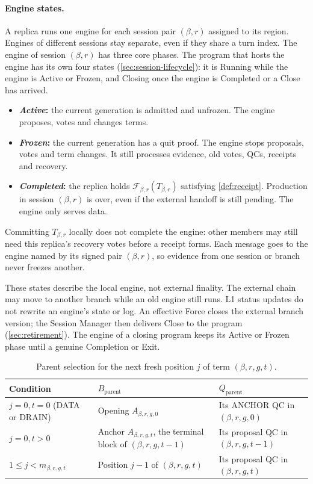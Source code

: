 \documentclass[11pt,a4paper]{article}
\newcommand{\FC}{\mathcal F}
\newcommand{\defterm}[1]{\textcolor{rrBlue}{\textit{#1}}}
\begin{document}
\paragraph{Engine states.}
A replica runs one engine for each session pair $(\beta,r)$ assigned to
its region. Engines of different sessions stay separate, even if they
share a turn index. The engine of session $(\beta,r)$ has three core
phases. The program that hosts the engine has its own four states
(\cref{sec:session-lifecycle}): it is Running while the engine is Active
or Frozen, and Closing once the engine is Completed or a Close has
arrived.
\begin{itemize}
\item \textbf{\defterm{Active}:} the current generation is admitted and
unfrozen. The engine proposes, votes and changes terms.
\item \textbf{\defterm{Frozen}:} the current generation has a quit proof.
The engine stops proposals, votes and term changes. It still processes
evidence, old votes, QCs, receipts and recovery.
\item \textbf{\defterm{Completed}:} the replica holds
$\FC_{\beta,r}(T_{\beta,r})$ satisfying \cref{def:receipt}. Production in
session $(\beta,r)$ is over, even if the external handoff is still
pending. The engine only serves data.
\end{itemize}
Committing $T_{\beta,r}$ locally does not complete the engine: other
members may still need this replica's recovery votes before a receipt
forms. Each message goes to the engine named by its signed pair
$(\beta,r)$, so evidence from one session or branch never freezes
another.

These states describe the local engine, not external finality. The
external chain may move to another branch while an old engine still
runs. L1 status updates do not rewrite an engine's state or log. An
effective Force closes the external branch version; the Session Manager
then delivers Close to the program (\cref{sec:retirement}). The engine
of a closing program keeps its Active or Frozen phase until a genuine
Completion or Exit.

\begin{table}[htbp]\centering\small
\caption{Parent selection for the next fresh position $j$ of term $(\beta,r,g,t)$.}
\label{tab:parent}
\begin{tabularx}{\linewidth}{@{}l Y Y@{}}
\toprule
Condition & $B_{\mathrm{parent}}$ & $Q_{\mathrm{parent}}$\\
\midrule
$j=0,t=0$ (DATA or DRAIN) & Opening $A_{\beta,r,g,0}$ & Its ANCHOR QC in $(\beta,r,g,0)$\\
$j=0,t>0$ & Anchor $A_{\beta,r,g,t}$, the terminal block of $(\beta,r,g,t-1)$ & Its proposal QC in $(\beta,r,g,t-1)$\\
$1\le j<m_{\beta,r,g,t}$ & Position $j-1$ of $(\beta,r,g,t)$ & Its proposal QC in $(\beta,r,g,t)$\\
\bottomrule
\end{tabularx}
\end{table}
\end{document}
